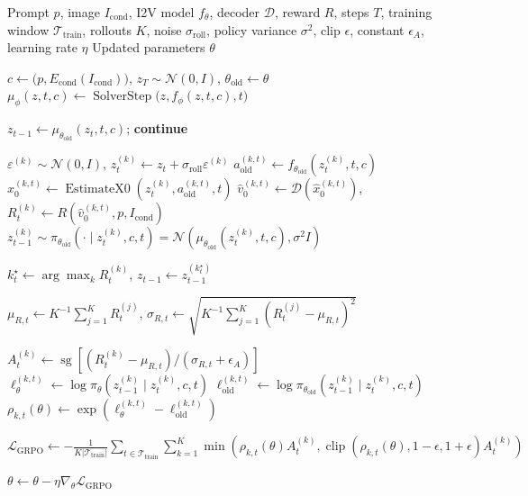 \documentclass{article}
\begin{document}
\begin{algorithm}[t]
\caption{PhyPO-I2V with Best-of-\(K\) Trajectory Selection}
\label{alg:phypo-i2v}
\footnotesize
\setlength{\algorithmicindent}{1em}
\begin{algorithmic}[1]

\Require Prompt \(p\), image \(I_{\mathrm{cond}}\), I2V model \(f_\theta\),
decoder \(\mathcal D\), reward \(R\), steps \(T\), training window
\(\mathcal T_{\mathrm{train}}\), rollouts \(K\), noise
\(\sigma_{\mathrm{roll}}\), policy variance \(\sigma^2\), clip
\(\epsilon\), constant \(\epsilon_A\), learning rate \(\eta\)
\Ensure Updated parameters \(\theta\)

\State \(c\gets\bigl(p,E_{\mathrm{cond}}(I_{\mathrm{cond}})\bigr)\),
\(z_T\sim\mathcal N(0,I)\), \(\theta_{\mathrm{old}}\gets\theta\)
\State \(\mu_\phi(z,t,c)\gets
\operatorname{SolverStep}\bigl(z,f_\phi(z,t,c),t\bigr)\)

        \State \(z_{t-1}\gets\mu_{\theta_{\mathrm{old}}}(z_t,t,c)\);
        \textbf{continue}
    \EndIf

        \State \(\varepsilon^{(k)}\sim\mathcal N(0,I)\), \quad
        \(z_t^{(k)}\gets z_t+\sigma_{\mathrm{roll}}\varepsilon^{(k)}\)
        \State \(a_{\mathrm{old}}^{(k,t)}
        \gets f_{\theta_{\mathrm{old}}}(z_t^{(k)},t,c)\)
        \State \(\hat{x}_0^{(k,t)}
        \gets\operatorname{EstimateX0}
        (z_t^{(k)},a_{\mathrm{old}}^{(k,t)},t)\)
        \State \(\hat v_0^{(k,t)}\gets\mathcal D(\hat x_0^{(k,t)})\), \quad
        \(R_t^{(k)}\gets R(\hat v_0^{(k,t)},p,I_{\mathrm{cond}})\)
        \State \(z_{t-1}^{(k)}
        \sim\pi_{\theta_{\mathrm{old}}}(\cdot\mid z_t^{(k)},c,t)
        =\mathcal N(\mu_{\theta_{\mathrm{old}}}(z_t^{(k)},t,c),\sigma^2I)\)
    \EndFor

    \State \(k_t^\star\gets\arg\max_k R_t^{(k)}\), \quad
    \(z_{t-1}\gets z_{t-1}^{(k_t^\star)}\)

    \State \(\mu_{R,t}\gets K^{-1}\sum_{j=1}^K R_t^{(j)}\), \quad
    \(\sigma_{R,t}\gets
    \sqrt{K^{-1}\sum_{j=1}^K(R_t^{(j)}-\mu_{R,t})^2}\)

        \State \(A_t^{(k)}\gets\operatorname{sg}\!\left[
        (R_t^{(k)}-\mu_{R,t})/(\sigma_{R,t}+\epsilon_A)\right]\)
        \State \(\ell_\theta^{(k,t)}
        \gets\log\pi_\theta(z_{t-1}^{(k)}\mid z_t^{(k)},c,t)\)
        \State \(\ell_{\mathrm{old}}^{(k,t)}
        \gets\log\pi_{\theta_{\mathrm{old}}}
        (z_{t-1}^{(k)}\mid z_t^{(k)},c,t)\)
        \State \(\rho_{k,t}(\theta)
        \gets\exp(\ell_\theta^{(k,t)}-\ell_{\mathrm{old}}^{(k,t)})\)
    \EndFor
\EndFor

\State \(\displaystyle
\mathcal L_{\mathrm{GRPO}}\gets
-\frac{1}{K|\mathcal T_{\mathrm{train}}|}
\sum_{t\in\mathcal T_{\mathrm{train}}}\sum_{k=1}^K
\min\!\left(
\rho_{k,t}(\theta)A_t^{(k)},
\operatorname{clip}(\rho_{k,t}(\theta),1-\epsilon,1+\epsilon)A_t^{(k)}
\right)\)

\State \(\theta\gets\theta-\eta\nabla_\theta\mathcal L_{\mathrm{GRPO}}\)

\end{algorithmic}
\end{algorithm}
\end{document}
